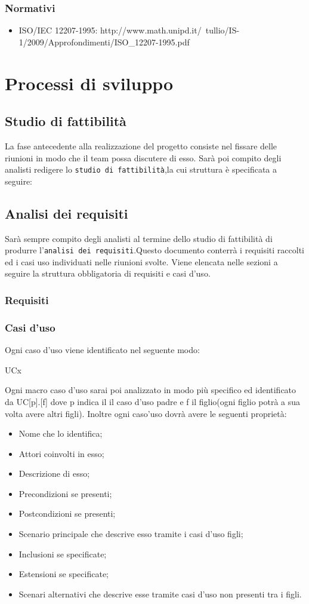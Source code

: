 		\subsubsection{Normativi}
		\begin{itemize}
		\item ISO/IEC 12207-1995: http://www.math.unipd.it/~tullio/IS-1/2009/Approfondimenti/ISO_12207-1995.pdf
		\end{itemize}
\section{Processi di sviluppo}
	\subsection{Studio di fattibilità}
	La fase antecedente alla realizzazione del progetto consiste nel fissare delle riunioni in modo che il team possa discutere di esso. Sarà poi compito degli analisti redigere lo \texttt{studio di fattibilità},la cui struttura è specificata a seguire: %
	\subsection{Analisi dei requisiti}
	Sarà sempre compito degli analisti al termine dello studio di fattibilità di produrre l'\texttt{analisi dei requisiti}.Questo documento conterrà i requisiti raccolti ed i casi uso individuati nelle riunioni svolte.
	Viene elencata nelle sezioni a seguire la struttura obbligatoria di requisiti e casi d'uso.
		\subsubsection{Requisiti}
		\subsubsection{Casi d'uso}
		Ogni caso d'uso viene identificato nel seguente modo:
		\centerline{UCx}
		Ogni macro caso d'uso sarai poi analizzato in modo più specifico ed identificato da UC[p].[f] dove p indica il il caso d'uso padre e f il figlio(ogni figlio potrà a sua volta avere altri figli).
		Inoltre ogni caso'uso dovrà avere le seguenti proprietà:
		\begin{itemize}
		\item Nome che lo identifica;
		\item Attori coinvolti in esso;
		\item Descrizione di esso;
		\item Precondizioni se presenti;
		\item Postcondizioni se presenti;
		\item Scenario principale che descrive esso tramite i casi d'uso figli;
		\item Inclusioni se specificate;
		\item Estensioni se specificate;
		\item Scenari alternativi che descrive esse tramite casi d'uso non presenti tra i figli.
		\end{itemize}
